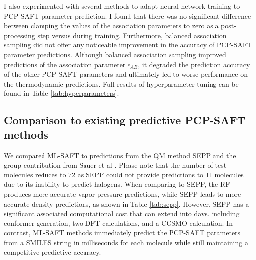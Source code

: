 I also experimented with several methods to adapt neural network training to PCP-SAFT parameter prediction. I found that there was no significant difference between clamping the values of the association parameters to zero as a post-processing step versus during training. Furthermore, balanced association sampling did not offer any noticeable improvement in the accuracy of PCP-SAFT parameter predictions. Although balanced association sampling improved predictions of the association parameter $\epsilon_{AB}$, it degraded the prediction accuracy of the other PCP-SAFT parameters and ultimately led to worse performance on the thermodynamic predictions. Full results of hyperparameter tuning can be found in Table \ref{tab:hyperparameters}.



\subsection{Comparison to existing predictive PCP-SAFT methods}

We compared ML-SAFT to predictions from the QM method SEPP \cite{Kaminski2020} and the group contribution from Sauer et al \cite{Sauer2014}.  Please note that the number of test molecules reduces to 72 as SEPP could not provide predictions to 11 molecules due to its inability to predict halogens. When comparing to SEPP, the RF produces more accurate vapor pressure predictions, while SEPP leads to more accurate density predictions, as shown in Table \ref{tab:sepp}. However, SEPP has a significant associated computational cost that can extend into days, including conformer generation, two DFT calculations, and a COSMO calculation. In contrast, ML-SAFT methods immediately predict the PCP-SAFT parameters from a SMILES string in milliseconds for each molecule while still maintaining a competitive predictive accuracy.  


